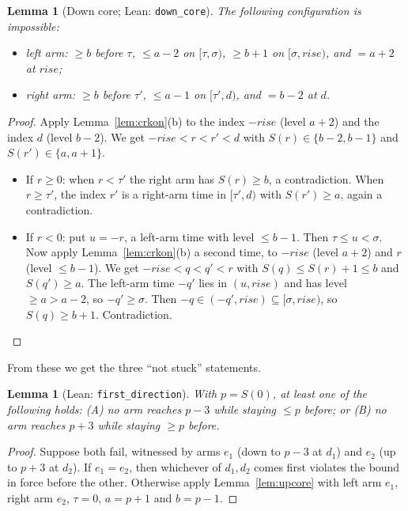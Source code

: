 \documentclass[11pt]{article}
\newtheorem{lemma}[theorem]{Lemma}
\theoremstyle{definition}
\theoremstyle{remark}
\newcommand{\lean}[1]{\texttt{#1}}
\begin{document}
\begin{lemma}[Down core; Lean: \lean{down\_core}]\label{lem:downcore}
The following configuration is impossible:
\begin{itemize}
\item left arm: $\ge b$ before $\tau$, $\le a-2$ on $[\tau,\sigma)$, $\ge b+1$
on $[\sigma,\mathit{rise})$, and $=a+2$ at $\mathit{rise}$;
\item right arm: $\ge b$ before $\tau'$, $\le a-1$ on $[\tau',d)$, and $=b-2$
at $d$.
\end{itemize}
\end{lemma}
\begin{proof}
Apply Lemma~\ref{lem:crkon}(b) to the index $-\mathit{rise}$ (level $a+2$) and
the index $d$ (level $b-2$). We get $-\mathit{rise}<r<r'<d$ with
$S(r)\in\{b-2,b-1\}$ and $S(r')\in\{a,a+1\}$.
\begin{itemize}
\item If $r\ge0$: when $r<\tau'$ the right arm has $S(r)\ge b$, a
contradiction. When $r\ge\tau'$, the index $r'$ is a right-arm time in
$[\tau',d)$ with $S(r')\ge a$, again a contradiction.
\item If $r<0$: put $u=-r$, a left-arm time with level $\le b-1$. Then
$\tau\le u<\sigma$. Now apply Lemma~\ref{lem:crkon}(b) a second time, to
$-\mathit{rise}$ (level $a+2$) and $r$ (level $\le b-1$). We get
$-\mathit{rise}<q<q'<r$ with $S(q)\le S(r)+1\le b$ and $S(q')\ge a$. The
left-arm time $-q'$ lies in $(u,\mathit{rise})$ and has level $\ge a>a-2$, so
$-q'\ge\sigma$. Then $-q\in(-q',\mathit{rise})\subseteq[\sigma,\mathit{rise})$,
so $S(q)\ge b+1$. Contradiction.\qedhere
\end{itemize}
\end{proof}

From these we get the three ``not stuck'' statements.

\begin{lemma}[Lean: \lean{first\_direction}]\label{lem:first}
With $p=S(0)$, at least one of the following holds:
(A) no arm reaches $p-3$ while staying $\le p$ before; or
(B) no arm reaches $p+3$ while staying $\ge p$ before.
\end{lemma}
\begin{proof}
Suppose both fail, witnessed by arms $e_1$ (down to $p-3$ at $d_1$) and $e_2$
(up to $p+3$ at $d_2$). If $e_1=e_2$, then whichever of $d_1,d_2$ comes first
violates the bound in force before the other. Otherwise apply
Lemma~\ref{lem:upcore} with left arm $e_1$, right arm $e_2$, $\tau=0$,
$a=p+1$ and $b=p-1$.
\end{proof}
\end{document}
